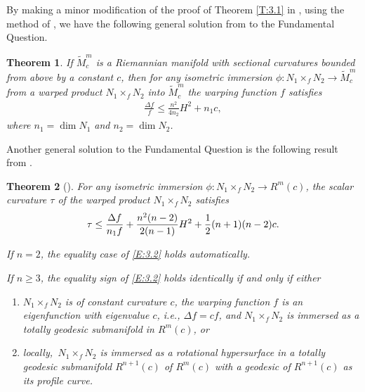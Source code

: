 \documentclass{amsart}
\theoremstyle{plain}
\newtheorem{theorem}{Theorem}[section]
\numberwithin{equation}{section}
\theoremstyle{remark}
\numberwithin{equation}{section}
\begin{document}
By  making a minor modification of the proof of Theorem \ref{T:3.1} in \cite{c02}, using the method of \cite{c05}, we have the following  general solution from \cite{CWei} to the Fundamental Question.

\begin{theorem}\label{T:3.2} If $\tilde M^m_c$ is a Riemannian manifold with sectional curvatures bounded from above by a constant $c$, then for any isometric immersion $\phi : N_1 \times _f N_2 \to \tilde M^m_c$   from a warped product $N_1 \times _f N_2$ into  $\tilde M^m_c$ the warping function $f$ satisfies
\begin{align}\label{3.1} \frac{\Delta f} {f}\leq \frac{n^2}{4n_2}H^2+ n_1c,\end{align}
where $n_1= \dim N_1$ and $n_2=\dim N_2$.  \end{theorem}

Another general solution to the Fundamental Question is the following result  from \cite{c04}.

\begin{theorem}[\cite{c12}]  For any  isometric immersion $\phi:N_1\times_f N_2\to R^m(c)$, the scalar curvature $\tau$ of  the warped product $N_1\times_f N_2$ satisfies
\begin{equation}\label{E:3.2}\tau\leq {\Delta f\over {n_1f}}+{{n^2(n-2)}\over{2(n-1)}}H^2+{1\over 2}(n+1)(n-2)c.\end{equation} 

 If $n=2$, the equality case of  \eqref{E:3.2} holds automatically.  

 If $n\geq 3$, the equality sign of  \eqref{E:3.2} holds identically if and only if  either

\begin{enumerate}
 \item  $N_1\times_f N_2$  is of constant  curvature $c$, the warping function $f$ is an eigenfunction with eigenvalue $c$, i.e.,  $\Delta f=cf$, and $N_1\times_f N_2$ is immersed as a totally geodesic submanifold in $R^m(c)$, or 

\item locally, $\,N_1\times_f N_2$ is immersed as a rotational hypersurface in a  totally geodesic submanifold $R^{n+1}(c)$ of $R^m(c)$ with a geodesic of $R^{n+1}(c)$ as its profile curve.\end{enumerate}\end{theorem}
\end{document}
